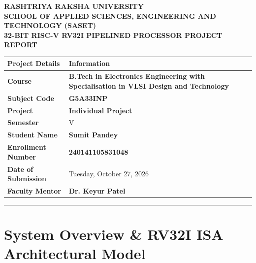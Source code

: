 \documentclass[10.5pt,a4paper]{article}
\begin{document}

\begin{center}
{\Large\textbf{RASHTRIYA RAKSHA UNIVERSITY}}\\[2pt]
{\large\textbf{SCHOOL OF APPLIED SCIENCES, ENGINEERING AND TECHNOLOGY (SASET)}}\\[4pt]
{\Large\textbf{32-BIT RISC-V RV32I PIPELINED PROCESSOR PROJECT REPORT}}
\end{center}

\vspace{0.15cm}

\noindent
\begin{tabular}{|l|p{11.0cm}|}
\hline
\textbf{Project Details} & \textbf{Information} \\
\hline
\textbf{Course} & \textbf{B.Tech in Electronics Engineering with Specialisation in VLSI Design and Technology} \\
\textbf{Subject Code} & \textbf{G5A33INP} \\
\textbf{Project} & \textbf{Individual Project} \\
\textbf{Semester} & V \\
\textbf{Student Name} & \textbf{Sumit Pandey} \\
\textbf{Enrollment Number} & \textbf{240141105831048} \\
\textbf{Date of Submission} & Tuesday, October 27, 2026 \\
\textbf{Faculty Mentor} & \textbf{Dr. Keyur Patel} \\
\hline
\end{tabular}

\vspace{0.5cm}
\hrule
\vspace{0.5cm}

\setcounter{tocdepth}{2}
\tableofcontents

\newpage


\section{System Overview \& RV32I ISA Architectural Model}
\end{document}
